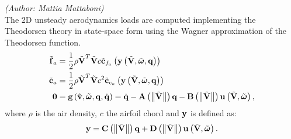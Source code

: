 %
%
%
%
%
% 
%
%
%

\emph{(Author: Mattia Mattaboni)} \\
The 2D unsteady aerodynamics loads are computed implementing
the Theodorsen theory in state-space form using
the Wagner approximation of the Theodorsen function.
\begin{subequations}
\begin{align}
	\tilde{\bm{\mathbf{f}}}_a &= 
		\frac{1}{2} \rho \tilde{\bm{\mathbf{V}}}^T \tilde{\bm{\mathbf{V}}} c
		\tilde{\bm{\mathbf{c}}}_{f_{a}}
		\left(  \bm{\mathbf{y}} 
		\left(  \tilde{\bm{\mathbf{V}}}, \tilde{\bm{\mathbf{\omega}}}, \bm{\mathbf{q}} \right) \right)\\
	\tilde{\bm{\mathbf{c}}}_a &= 
		\frac{1}{2} \rho \tilde{\bm{\mathbf{V}}}^T \tilde{\bm{\mathbf{V}}} c^2
		\tilde{\bm{\mathbf{c}}}_{c_{a}} 
		\left(  \bm{\mathbf{y}} 
		\left(  \tilde{\bm{\mathbf{V}}}, \tilde{\bm{\mathbf{\omega}}}, \bm{\mathbf{q}} \right) \right)\\
	\bm{\mathbf{0}} &=
		\bm{\mathbf{g}}\left( \tilde{\bm{\mathbf{v}}},\tilde{\bm{\mathbf{\omega}}},\bm{\mathbf{q}}, \dot{\bm{\mathbf{q}}} \right) = 
		\dot{\bm{\mathbf{q}}} - \bm{\mathbf{A}}\left( \left\| \tilde{\bm{\mathbf{V}}} \right\| \right) \bm{\mathbf{q}} - \bm{\mathbf{B}}\left( \left\| \tilde{\bm{\mathbf{V}}} \right\| \right)
 		\bm{\mathbf{u}}\left( \tilde{\bm{\mathbf{V}}}, \tilde{\bm{\mathbf{\omega}}} \right),
\end{align}
\end{subequations}
where $\rho$ is the air density, $c$ the airfoil chord and $\bm{\mathbf{y}}$ is defined as:
\begin{equation}
	\bm{\mathbf{y}} = \bm{\mathbf{C}}\left(  \left\| \tilde{\bm{\mathbf{V}}} \right\| \right) \bm{\mathbf{q}} + \bm{\mathbf{D}} \left(  \left\| \tilde{\bm{\mathbf{V}}} \right\| \right)
 		\bm{\mathbf{u}}\left( \tilde{\bm{\mathbf{V}}}, \tilde{\bm{\mathbf{\omega}}} \right).
\end{equation}

